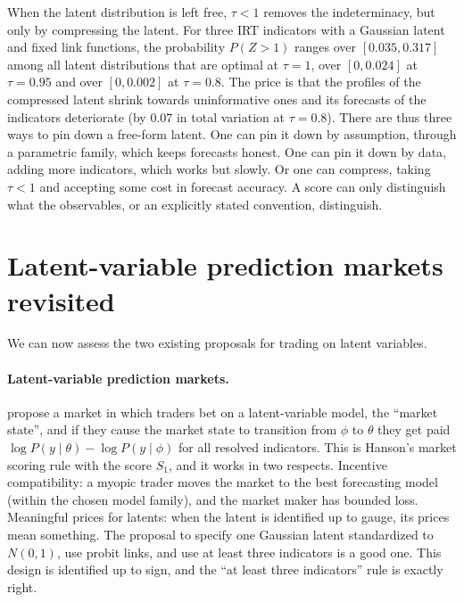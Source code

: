 \begin{draftblock}
When the latent distribution is left free, $\tau<1$ removes the indeterminacy, but only by compressing the latent. For three IRT indicators with a Gaussian latent and fixed link functions, the probability $P(Z>1)$ ranges over $[0.035,0.317]$ among all latent distributions that are optimal at $\tau=1$, over $[0,0.024]$ at $\tau=0.95$ and over $[0,0.002]$ at $\tau=0.8$. The price is that the profiles of the compressed latent shrink towards uninformative ones and its forecasts of the indicators deteriorate (by 0.07 in total variation at $\tau=0.8$). There are thus three ways to pin down a free-form latent. One can pin it down by assumption, through a parametric family, which keeps forecasts honest. One can pin it down by data, adding more indicators, which works but slowly. Or one can compress, taking $\tau<1$ and accepting some cost in forecast accuracy. A score can only distinguish what the observables, or an explicitly stated convention, distinguish.

\section{Latent-variable prediction markets revisited}\label{arb:sec:lvpm}

We can now assess the two existing proposals for trading on latent variables.

\paragraph{Latent-variable prediction markets.} \citet{tailcalledLatentVariablesPrediction2023} propose a market in which traders bet on a latent-variable model, the ``market state'', and if they cause the market state to transition from $\phi$ to $\theta$ they get paid $\log P(y\mid\theta)-\log P(y\mid\phi)$ for all resolved indicators. This is Hanson's market scoring rule with the score $S_1$, and it works in two respects. Incentive compatibility: a myopic trader moves the market to the best forecasting model (within the chosen model family), and the market maker has bounded loss. Meaningful prices for latents: when the latent is identified up to gauge, its prices mean something. The proposal to specify one Gaussian latent standardized to $N(0,1)$, use probit links, and use at least three indicators is a good one. This design is identified up to sign, and the ``at least three indicators'' rule is exactly right.


\end{draftblock}
